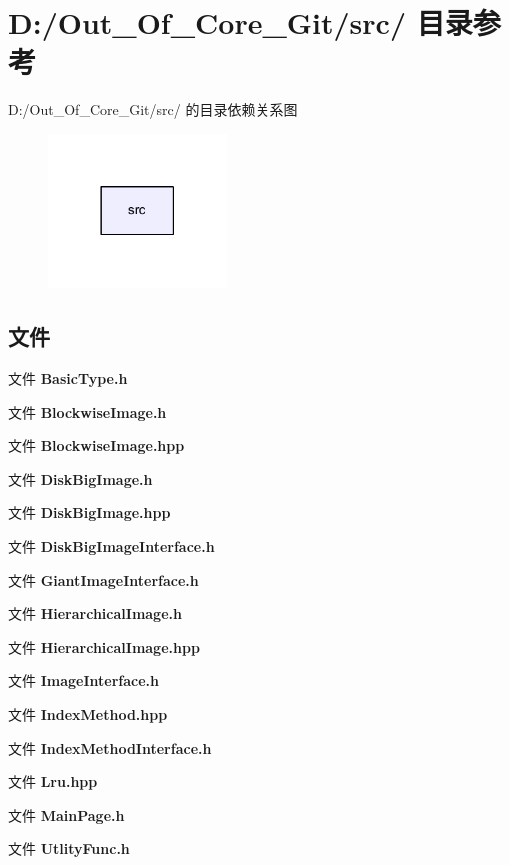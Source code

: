 \section{D\-:/\-Out\-\_\-\-Of\-\_\-\-Core\-\_\-\-Git/src/ 目录参考}
\label{dir_68267d1309a1af8e8297ef4c3efbcdba}
D\-:/\-Out\-\_\-\-Of\-\_\-\-Core\-\_\-\-Git/src/ 的目录依赖关系图\nopagebreak
\begin{figure}[H]
\begin{center}
\leavevmode
\includegraphics[width=134pt]{dir_68267d1309a1af8e8297ef4c3efbcdba_dep}
\end{center}
\end{figure}
\subsection*{文件}
\begin{DoxyCompactItemize}
\item 
文件 {\bfseries Basic\-Type.\-h}
\item 
文件 {\bfseries Blockwise\-Image.\-h}
\item 
文件 {\bfseries Blockwise\-Image.\-hpp}
\item 
文件 {\bfseries Disk\-Big\-Image.\-h}
\item 
文件 {\bfseries Disk\-Big\-Image.\-hpp}
\item 
文件 {\bfseries Disk\-Big\-Image\-Interface.\-h}
\item 
文件 {\bfseries Giant\-Image\-Interface.\-h}
\item 
文件 {\bfseries Hierarchical\-Image.\-h}
\item 
文件 {\bfseries Hierarchical\-Image.\-hpp}
\item 
文件 {\bfseries Image\-Interface.\-h}
\item 
文件 {\bfseries Index\-Method.\-hpp}
\item 
文件 {\bfseries Index\-Method\-Interface.\-h}
\item 
文件 {\bfseries Lru.\-hpp}
\item 
文件 {\bfseries Main\-Page.\-h}
\item 
文件 {\bfseries Utlity\-Func.\-h}
\end{DoxyCompactItemize}
